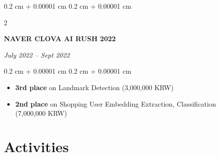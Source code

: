 \documentclass[10pt, letterpaper]{article}
\newenvironment{highlights}{
    \begin{itemize}[
        topsep=0.10 cm,
        parsep=0.10 cm,
        partopsep=0pt,
        itemsep=0pt,
        leftmargin=0.4 cm + 10pt
    ]
}{
    \end{itemize}
} %
\newenvironment{onecolentry}{
    \begin{adjustwidth}{
        0.2 cm + 0.00001 cm
    }{
        0.2 cm + 0.00001 cm
    }
}{
    \end{adjustwidth}
} %
\newenvironment{twocolentry}[2][]{
    \onecolentry
    \def\secondColumn{#2}
    \setcolumnwidth{\fill, 4.5 cm}
    \begin{paracol}{2}
}{
    \switchcolumn \raggedleft \secondColumn
    \end{paracol}
    \endonecolentry
} %
\let\hrefWithoutArrow\href
\renewcommand{\href}[2]{\hrefWithoutArrow{#1}{\ifthenelse{\equal{#2}{}}{ }{#2 }\raisebox{.15ex}{\footnotesize \faExternalLink*}}}
\begin{document}
\vspace{0.2 cm}

\begin{twocolentry}{
        \textit{July 2022 – Sept 2022}
    }
    \textbf{NAVER CLOVA AI RUSH 2022 \href{https://campaign.naver.com/clova_airush/}{[link]}}
\end{twocolentry}

\vspace{0.10 cm}
\begin{onecolentry}
    \begin{highlights}
        \item \textbf{3rd place} on Landmark Detection (3,000,000 KRW)
        \item \textbf{2nd place} on Shopping User Embedding Extraction, Classification (7,000,000 KRW)
    \end{highlights}
\end{onecolentry}

\section{Activities}
\end{document}
